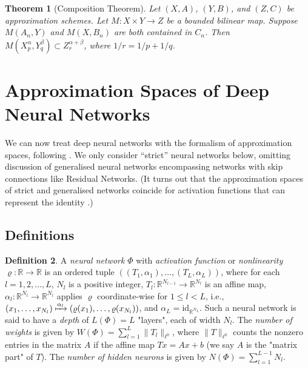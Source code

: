 \documentclass{article}
\newtheorem{theorem}{Theorem}[section]
\theoremstyle{definition}
\newtheorem{definition}[theorem]{Definition}
\theoremstyle{remark}
\begin{document}
\begin{theorem}[Composition Theorem]
    Let $(X,A)$, $(Y,B)$, and $(Z,C)$ be approximation schemes. Let $M: X \times Y \to Z$ be a bounded bilinear map. Suppose $M(A_n,Y)$ and $M(X,B_n)$ are both contained in $C_n$. Then $M(X_p^\alpha,Y_q^\beta) \subset Z_r^{\alpha+\beta}$, where $1/r = 1/p + 1/q$.
\end{theorem}



\section{Approximation Spaces of Deep Neural Networks}
We can now treat deep neural networks with the formalism of approximation spaces, following \cite{gribonval_approximation_2022}. We only consider “strict” neural networks below, omitting discussion of generalised neural networks encompassing networks with skip connections like Residual Networks. (It turns out that the approximation spaces of strict and generalised networks coincide for activation functions that can represent the identity \cite[Theorem 3.8]{gribonval_approximation_2022}.)


\subsection{Definitions}

\begin{definition}
    A \textit{neural network} $\Phi$ with \textit{activation function} or \textit{nonlinearity} $\varrho: \mathbb{R} \to \mathbb{R}$ is an ordered tuple $((T_1,\alpha_1),\ldots,(T_L,\alpha_L))$, where for each $l = 1,2,\ldots,L$, $N_l$ is a positive integer, $T_l: \mathbb{R}^{N_{l-1}} \to \mathbb{R}^{N_l}$ is an affine map, $\alpha_l: \mathbb{R}^{N_l} \to \mathbb{R}^{N_l}$ applies $\varrho$ coordinate-wise for $1 \leq l < L$, i.e., $(x_1,\ldots,x_{N_l}) \xmapsto{\alpha_l} (\varrho(x_1),\ldots,\varrho(x_{N_l}))$, and $\alpha_L = \mathrm{id}_{\mathbb{R}^{N_L}}$. Such a neural network is said to have a \textit{depth} of $L(\Phi) = L$ "layers", each of width $N_l$. The \textit{number of weights} is given by $W(\Phi) = \sum_{l=1}^L \lVert T_l \rVert_{\ell^0}$, where $\lVert T \rVert_{\ell^0}$ counts the nonzero entries in the matrix $A$ if the affine map $Tx = Ax+b$ (we say $A$ is the "matrix part" of $T$). The \textit{number of hidden neurons} is given by $N(\Phi) = \sum_{l=1}^{L-1} N_l$.
\end{definition}
\end{document}
